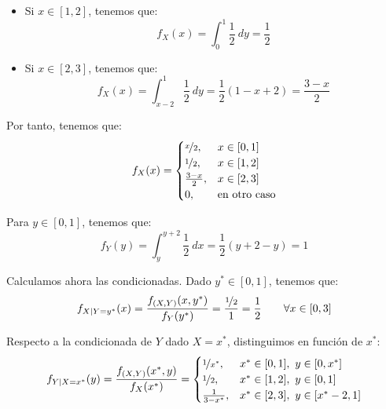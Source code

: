 \begin{ejercicio}
\begin{itemize}
        \item Si $x\in [1,2]$, tenemos que:
        \begin{equation*}
            f_X(x) = \int_{0}^{1} \dfrac{1}{2} \ dy = \dfrac{1}{2}
        \end{equation*}

        \item Si $x\in [2,3]$, tenemos que:
        \begin{equation*}
            f_X(x) = \int_{x-2}^{1} \dfrac{1}{2} \ dy = \dfrac{1}{2}(1-x+2)
            = \frac{3-x}{2}
        \end{equation*}
    \end{itemize}
    Por tanto, tenemos que:
    \begin{equation*}
        f_X(x) = \begin{cases}
            \nicefrac{x}{2}, & x\in [0,1]\\
            \nicefrac{1}{2}, & x\in [1,2]\\
            \frac{3-x}{2}, & x\in [2,3]\\
            0, & \text{en otro caso}
        \end{cases}
    \end{equation*}

    Para $y\in [0,1]$, tenemos que:
    \begin{equation*}
        f_Y(y) = \int_{y}^{y+2} \dfrac{1}{2} \ dx = \dfrac{1}{2}(y+2-y) = 1
    \end{equation*}

    Calculamos ahora las condicionadas. Dado $y^*\in [0,1]$, tenemos que:
    \begin{equation*}
        f_{X\mid Y=y^*}(x) = \dfrac{f_{(X,Y)}(x, y^*)}{f_Y(y^*)} = \dfrac{\nicefrac{1}{2}}{1} = \dfrac{1}{2} \qquad \forall x\in [0,3]
    \end{equation*}

    Respecto a la condicionada de $Y$ dado $X=x^*$, distinguimos en función de $x^*$:
    \begin{equation*}
        f_{Y\mid X=x^*}(y) = \dfrac{f_{(X,Y)}(x^*, y)}{f_X(x^*)} = \begin{cases}
            \nicefrac{1}{x^*}, & x^*\in [0,1],~y\in [0,x^*]\\
            \nicefrac{1}{2}, & x^*\in [1,2],~y\in [0,1]\\
            \frac{1}{3-x^*}, & x^*\in [2,3],~y\in [x^*-2,1]
        \end{cases}
    \end{equation*}


\end{ejercicio}
